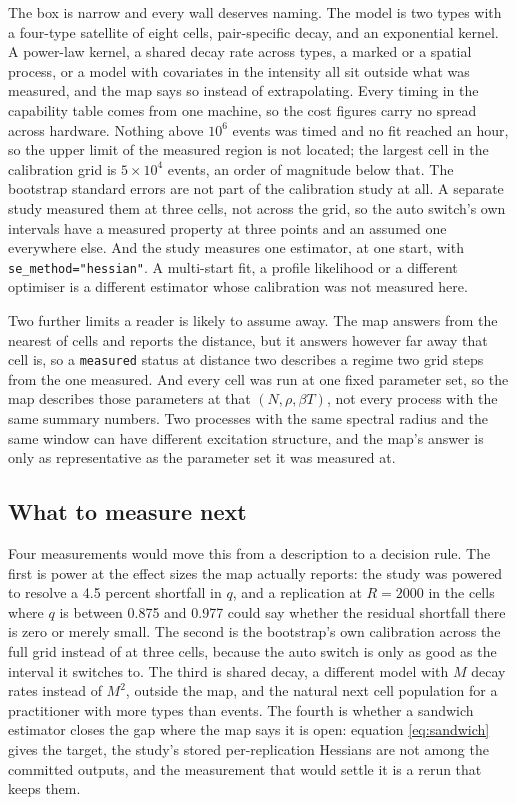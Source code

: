 The box is narrow and every wall deserves naming. The model is two types with a
four-type satellite of eight cells, pair-specific decay, and an exponential kernel.
A power-law kernel, a shared decay rate across types, a marked or a spatial process,
or a model with covariates in the intensity all sit outside what was measured, and
the map says so instead of extrapolating. Every timing in the capability table comes
from one machine, so the cost figures carry no spread across hardware. Nothing above
$10^6$ events was timed and no fit reached an hour, so the upper limit of the
measured region is not located; the largest cell in the calibration grid is
$5 \times 10^4$ events, an order of magnitude below that. The bootstrap standard
errors are not part of the calibration study at all. A separate study measured them
at three cells, not across the grid, so the auto switch's own intervals have a
measured property at three points and an assumed one everywhere else. And the study
measures one estimator, at one start, with \texttt{se\_method="hessian"}. A
multi-start fit, a profile likelihood or a different optimiser is a different
estimator whose calibration was not measured here.

Two further limits a reader is likely to assume away. The map answers from the
nearest of \HsixCells{} cells and reports the distance, but it answers however far
away that cell is, so a \texttt{measured} status at distance two describes a regime
two grid steps from the one measured. And every cell was run at one fixed parameter
set, so the map describes those parameters at that $(N, \rho, \beta T)$, not every
process with the same summary numbers. Two processes with the same spectral radius
and the same window can have different excitation structure, and the map's answer is
only as representative as the parameter set it was measured at.

\subsection{What to measure next}

Four measurements would move this from a description to a decision rule. The first
is power at the effect sizes the map actually reports: the study was powered to
resolve a 4.5 percent shortfall in $q$, and a replication at $R = 2000$ in the cells
where $q$ is between 0.875 and 0.977 could say whether the residual shortfall there
is zero or merely small. The second is the bootstrap's own calibration across the
full grid instead of at three cells, because the auto switch is only as good as the
interval it switches to. The third is shared decay, a different model with $M$ decay
rates instead of $M^2$, outside the map, and the natural next cell population for a
practitioner with more types than events. The fourth is whether a sandwich estimator
closes the gap where the map says it is open: equation \eqref{eq:sandwich} gives the
target, the study's stored per-replication Hessians are not among the committed
outputs, and the measurement that would settle it is a rerun that keeps them.
